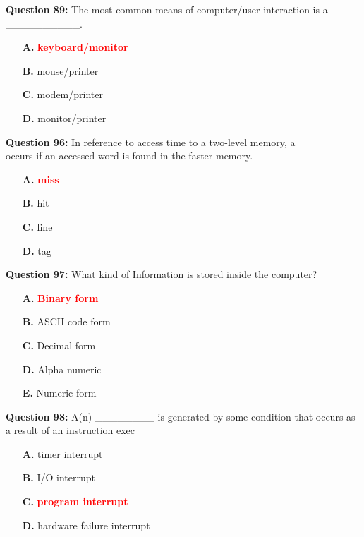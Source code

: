 \documentclass[12pt,a4paper]{article}
\begin{document}
\vspace{0.5cm}

\textbf{Question 89:} The most common means of computer/user interaction is a __________.

\begin{itemize}
    \item[\textbf{A.}] \textcolor{red}{\textbf{keyboard/monitor}}
    \item[\textbf{B.}] mouse/printer
    \item[\textbf{C.}] modem/printer
    \item[\textbf{D.}] monitor/printer
\end{itemize}

\vspace{0.5cm}

\textbf{Question 96:} In reference to access time to a two-level memory, a ________ occurs if an accessed word is found in the faster memory.

\begin{itemize}
    \item[\textbf{A.}] \textcolor{red}{\textbf{miss}}
    \item[\textbf{B.}] hit
    \item[\textbf{C.}] line
    \item[\textbf{D.}] tag
\end{itemize}

\vspace{0.5cm}

\textbf{Question 97:} What kind of Information is stored inside the computer?

\begin{itemize}
    \item[\textbf{A.}] \textcolor{red}{\textbf{Binary form}}
    \item[\textbf{B.}] ASCII code form
    \item[\textbf{C.}] Decimal form
    \item[\textbf{D.}] Alpha numeric
    \item[\textbf{E.}] Numeric form
\end{itemize}

\vspace{0.5cm}

\textbf{Question 98:} A(n) ________ is generated by some condition that occurs as a result of an instruction exec

\begin{itemize}
    \item[\textbf{A.}] timer interrupt
    \item[\textbf{B.}] I/O interrupt
    \item[\textbf{C.}] \textcolor{red}{\textbf{program interrupt}}
    \item[\textbf{D.}] hardware failure interrupt
\end{itemize}
\end{document}

